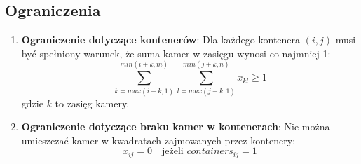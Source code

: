 \documentclass[12pt, letterpaper]{article}
\begin{document}
\subsection*{Ograniczenia}
\begin{enumerate}
  \item \textbf{Ograniczenie dotyczące kontenerów}:
        Dla każdego kontenera \( (i, j) \) musi być spełniony warunek, że suma
        kamer w zasięgu wynosi co najmniej 1:
        \[
          \sum_{k=max(i-k, 1)}^{min(i+k, m)} \sum_{l=max(j-k, 1)}^{min(j+k, n)}
          x_{kl} \geq 1
        \]
        gdzie \( k \) to zasięg kamery.

  \item \textbf{Ograniczenie dotyczące braku kamer w kontenerach}:
        Nie można umieszczać kamer w kwadratach zajmowanych przez kontenery:
        \[
          x_{ij} = 0 \quad \text{jeżeli } containers_{ij} = 1
        \]
\end{enumerate}
\end{document}
